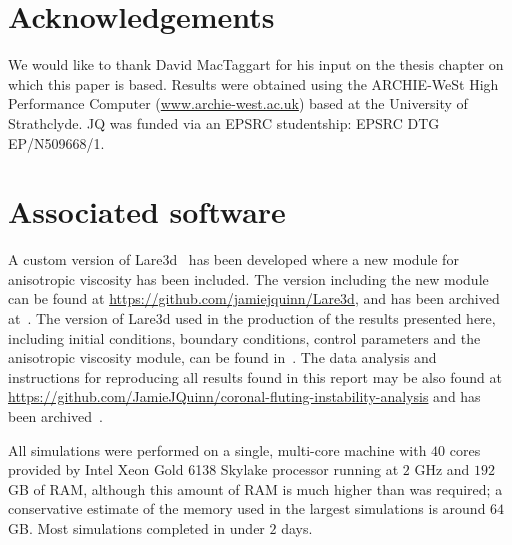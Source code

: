 \documentclass[fleqn,usenatbib]{mnras}
\begin{document}
\section*{Acknowledgements}

We would like to thank David MacTaggart for his input on the thesis chapter on which this paper is based. Results were obtained using the ARCHIE-WeSt High Performance Computer
(\url{www.archie-west.ac.uk}) based at the University of
Strathclyde. JQ was funded via an EPSRC studentship: EPSRC DTG EP/N509668/1.




\appendix

\section{Associated software}

A custom version of Lare3d~\citep{arberStaggeredGridLagrangian2001} has been developed where a new module for anisotropic viscosity has been included. The version including the new module can be found at \url{https://github.com/jamiejquinn/Lare3d}, and has been archived at~\citep{keith_bennett_2020_4155546}. The version of Lare3d used in the production of the results presented here, including initial conditions, boundary conditions, control parameters and the anisotropic viscosity module, can be found in~\citet{keith_bennett_2020_4155625}. The data analysis and instructions for reproducing all results found in this report may be also found at \url{https://github.com/JamieJQuinn/coronal-fluting-instability-analysis} and has been archived~\citep{quinnJamieJQuinnCoronalflutinginstabilityanalysis2021}.

All simulations were performed on a single, multi-core machine with $40$ cores provided by Intel Xeon Gold 6138 Skylake processor running at $2$ GHz and $192$ GB of RAM, although this amount of RAM is much higher than was required; a conservative estimate of the memory used in the largest simulations is around $64$ GB. Most simulations completed in under $2$ days.

\bsp	%
\label{lastpage}
\end{document}
